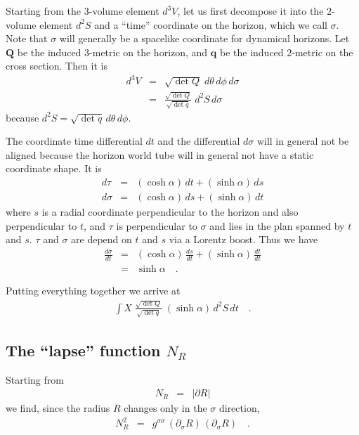 Starting from the $3$-volume element $d^3V$, let us first decompose
it into the $2$-volume element $d^2S$ and a ``time'' coordinate on the
horizon, which we call $\sigma$.  Note that $\sigma$ will generally be
a spacelike coordinate for dynamical horizons.  Let $\mathbf{Q}$ be
the induced $3$-metric on the horizon, and $\mathbf{q}$ be the induced
$2$-metric on the cross section.
Then it is
\begin{eqnarray}
   d^3V & = & \sqrt{\det Q}\; d\theta\, d\phi\, d\sigma
\\
   & = & \frac{\sqrt{\det Q}}{\sqrt{\det q}}\; d^2S\, d\sigma
\end{eqnarray}
because $d^2S = \sqrt{\det q}\, d\theta\, d\phi$.

The coordinate time differential $dt$ and the differential $d\sigma$
will in general not be aligned because the horizon world tube will in
general not have a static coordinate shape.  It is
\begin{eqnarray}
   d\tau   & = & (\cosh \alpha)\, dt + (\sinh \alpha)\, ds
\\
   d\sigma & = & (\cosh \alpha)\, ds + (\sinh \alpha)\, dt
\end{eqnarray}
where $s$ is a radial coordinate perpendicular to the horizon and also
perpendicular to $t$, and $\tau$ is perpendicular to $\sigma$ and lies
in the plan spanned by $t$ and $s$.  $\tau$ and $\sigma$ are depend on
$t$ and $s$ via a Lorentz boost.  Thus we have
\begin{eqnarray}
   \frac{d\sigma}{dt} & = & (\cosh \alpha)\, \frac{ds}{dt} + (\sinh
   \alpha)\, \frac{dt}{dt}
\\
   & = & \sinh \alpha \quad\textrm{.}
\end{eqnarray}

Putting everything together we arrive at
\begin{eqnarray}
   \int X\; \frac{\sqrt{\det Q}}{\sqrt{\det q}}\; (\sinh \alpha)\,
   d^2S\, dt \quad\textrm{.}
\end{eqnarray}



\subsection{The ``lapse'' function $N_R$}

Starting from
\begin{eqnarray}
   N_R & = & | \partial R |
\end{eqnarray}
we find, since the radius $R$ changes only in the $\sigma$ direction,
\begin{eqnarray}
   N_R^2 & = & g^{\sigma\sigma}\, (\partial_\sigma R)\,
   (\partial_\sigma R) \quad\textrm{.}
\end{eqnarray}

